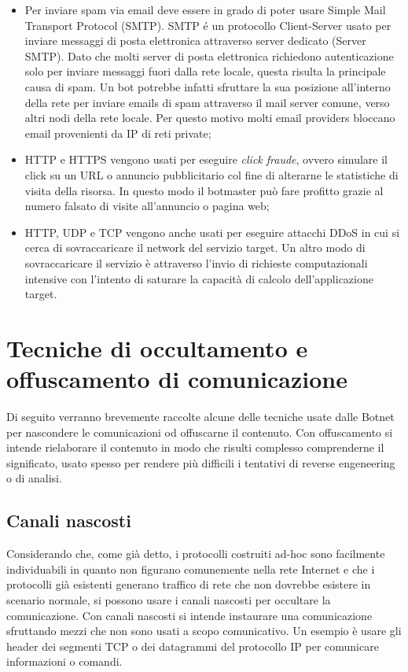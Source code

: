\begin{itemize}
    \item Per inviare spam via email deve essere in grado di poter usare  Simple Mail Transport Protocol (SMTP). SMTP é un protocollo Client-Server usato per inviare messaggi di posta elettronica attraverso server dedicato (Server SMTP). Dato che molti server di posta elettronica richiedono autenticazione solo per inviare messaggi fuori dalla rete locale, questa risulta la principale causa di spam. Un bot potrebbe infatti sfruttare la sua posizione all'interno della rete per inviare emails di spam attraverso il mail server comune, verso altri nodi della rete locale. Per questo motivo molti email providers bloccano email provenienti da IP di reti private;
    \item HTTP e HTTPS vengono usati per eseguire \textit{click fraude}, ovvero simulare il click su un URL o  annuncio pubblicitario col fine di alterarne le statistiche di visita della risorsa. In questo modo il botmaster può fare profitto grazie al numero falsato di visite all'annuncio o pagina web;
    \item HTTP, UDP e TCP vengono anche usati per eseguire attacchi DDoS in cui si cerca di sovraccaricare il network del servizio target. Un altro modo di sovraccaricare il servizio è attraverso l'invio di richieste computazionali intensive con l'intento di saturare la capacità di calcolo dell'applicazione target.
\end{itemize}


\section{Tecniche di occultamento e offuscamento di comunicazione}
\label{TecnicheOccultamento}
Di seguito verranno brevemente raccolte alcune delle tecniche usate dalle Botnet per nascondere le comunicazioni od offuscarne il contenuto. Con offuscamento si intende rielaborare il contenuto in modo che risulti complesso comprenderne il significato, usato spesso per rendere più difficili i tentativi di reverse engeneering o di analisi.

\subsection*{Canali nascosti}
 Considerando che, come  già detto, i protocolli costruiti ad-hoc sono facilmente individuabili in quanto non figurano comunemente nella rete Internet e che i protocolli già esistenti generano traffico di rete che non dovrebbe esistere in scenario normale,  si possono usare i canali nascosti per occultare la comunicazione.
  Con canali nascosti si intende instaurare una comunicazione sfruttando mezzi che non sono usati a scopo comunicativo. Un esempio è usare gli header dei segmenti TCP o dei datagrammi del protocollo IP per comunicare informazioni o comandi. 

